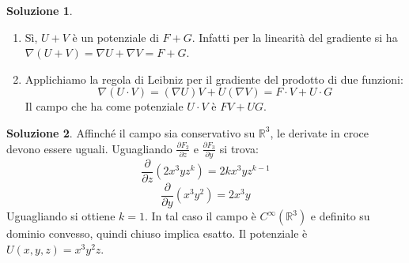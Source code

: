 \documentclass[12pt,a4paper]{article}
\theoremstyle{definition}
\newtheorem{sol}{Soluzione}
\begin{document}
\begin{sol}
    \begin{enumerate}
        \item Sì, $U+V$ è un potenziale di $F+G$. Infatti per la linearità del gradiente si ha $\nabla(U+V) = \nabla U + \nabla V = F + G$.
        \item Applichiamo la regola di Leibniz per il gradiente del prodotto di due funzioni:
              \[
                  \nabla(U \cdot V) = (\nabla U)V + U(\nabla V) = F \cdot V + U \cdot G
              \]
              Il campo che ha come potenziale $U \cdot V$ è $F V + U G$.
    \end{enumerate}
\end{sol}

\begin{sol}
    Affinché il campo sia conservativo su $\mathbb{R}^3$, le derivate in croce devono essere uguali. Uguagliando $\frac{\partial F_2}{\partial z}$ e $\frac{\partial F_3}{\partial y}$ si trova:
    \[
        \frac{\partial}{\partial z}(2x^3 y z^k) = 2kx^3 y z^{k-1}
    \]
    \[
        \frac{\partial}{\partial y}(x^3 y^2) = 2x^3 y
    \]
    Uguagliando si ottiene $k=1$. In tal caso il campo è $C^\infty(\mathbb{R}^3)$ e definito su dominio convesso, quindi chiuso implica esatto. Il potenziale è $U(x,y,z) = x^3 y^2 z$.
\end{sol}
\end{document}
